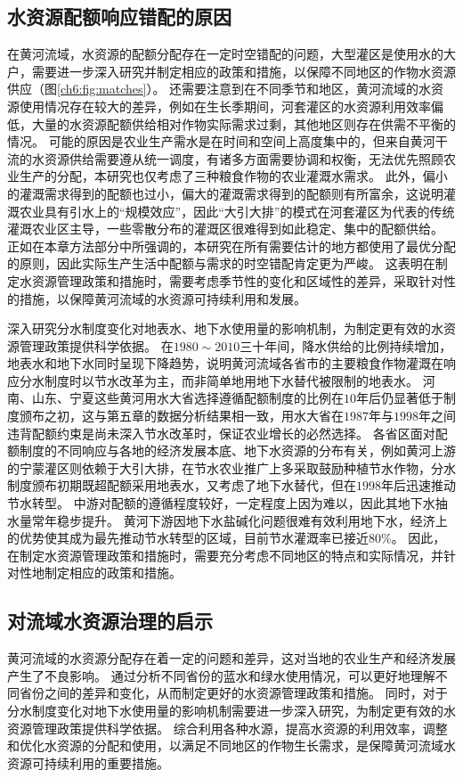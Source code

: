 \subsection{水资源配额响应错配的原因}

在黄河流域，水资源的配额分配存在一定时空错配的问题，大型灌区是使用水的大户，需要进一步深入研究并制定相应的政策和措施，以保障不同地区的作物水资源供应（图\ref{ch6:fig:matches}）。
还需要注意到在不同季节和地区，黄河流域的水资源使用情况存在较大的差异，例如在生长季期间，河套灌区的水资源利用效率偏低，大量的水资源配额供给相对作物实际需求过剩，其他地区则存在供需不平衡的情况。
可能的原因是农业生产需水是在时间和空间上高度集中的，但来自黄河干流的水资源供给需要遵从统一调度，有诸多方面需要协调和权衡，无法优先照顾农业生产的分配，本研究也仅考虑了三种粮食作物的农业灌溉水需求。
此外，偏小的灌溉需求得到的配额也过小，偏大的灌溉需求得到的配额则有所富余，这说明灌溉农业具有引水上的“规模效应”，因此“大引大排”的模式在河套灌区为代表的传统灌溉农业区主导，一些零散分布的灌溉区很难得到如此稳定、集中的配额供给。
正如在本章方法部分中所强调的，本研究在所有需要估计的地方都使用了最优分配的原则，因此实际生产生活中配额与需求的时空错配肯定更为严峻。
这表明在制定水资源管理政策和措施时，需要考虑季节性的变化和区域性的差异，采取针对性的措施，以保障黄河流域的水资源可持续利用和发展。

深入研究分水制度变化对地表水、地下水使用量的影响机制，为制定更有效的水资源管理政策提供科学依据。
在$1980 \sim 2010$三十年间，降水供给的比例持续增加，地表水和地下水同时呈现下降趋势，说明黄河流域各省市的主要粮食作物灌溉在响应分水制度时以节水改革为主，而非简单地用地下水替代被限制的地表水。
河南、山东、宁夏这些黄河用水大省选择遵循配额制度的比例在$10$年后仍显著低于制度颁布之初，这与第五章的数据分析结果相一致，用水大省在$1987$年与$1998$年之间违背配额约束是尚未深入节水改革时，保证农业增长的必然选择。
各省区面对配额制度的不同响应与各地的经济发展本底、地下水资源的分布有关，例如黄河上游的宁蒙灌区则依赖于大引大排，在节水农业推广上多采取鼓励种植节水作物，分水制度颁布初期既超配额采用地表水，又考虑了地下水替代，但在$1998$年后迅速推动节水转型。
中游对配额的遵循程度较好，一定程度上因为难以，因此其地下水抽水量常年稳步提升。
黄河下游因地下水盐碱化问题很难有效利用地下水，经济上的优势使其成为最先推动节水转型的区域，目前节水灌溉率已接近$80\%$。
因此，在制定水资源管理政策和措施时，需要充分考虑不同地区的特点和实际情况，并针对性地制定相应的政策和措施。

\subsection{对流域水资源治理的启示}

黄河流域的水资源分配存在着一定的问题和差异，这对当地的农业生产和经济发展产生了不良影响。
通过分析不同省份的蓝水和绿水使用情况，可以更好地理解不同省份之间的差异和变化，从而制定更好的水资源管理政策和措施。
同时，对于分水制度变化对地下水使用量的影响机制需要进一步深入研究，为制定更有效的水资源管理政策提供科学依据。
综合利用各种水源，提高水资源的利用效率，调整和优化水资源的分配和使用，以满足不同地区的作物生长需求，是保障黄河流域水资源可持续利用的重要措施。